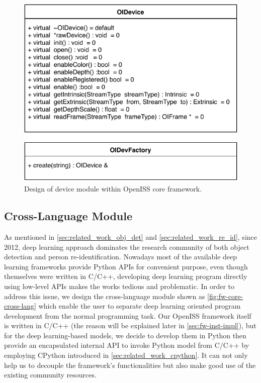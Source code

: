 \begin{figure}
    \centering
    \includegraphics[scale=0.8]{figures/framework_core_device.pdf}
    \caption{Design of device module within OpenISS core framework.}
    \label{fig:fw-core-device}
\end{figure}

\subsection{Cross-Language Module}
\label{sec:fw-design-core-cross-lang}

As mentioned in \autoref{sec:related_work_obj_det} and
\autoref{sec:related_work_re_id}, since 2012, deep learning approach dominates the
research community of both object detection and person re-identification.
Nowadays most of the available deep learning frameworks provide Python APIs for
convenient purpose, even though themselves were written in C/C++, developing
deep learning program directly using low-level APIs makes the works tedious and
problematic.
In order to address this issue, we design the cross-language module shown as
\autoref{fig:fw-core-cross-lang} which
enable the user to separate deep learning oriented program development from the
normal programming task. Our OpenISS framework itself is written in C/C++ (the
reason will be explained later in \autoref{sec:fw-inst-impl}), but for the deep
learning-based
models, we decide to develop them in Python then provide an encapsulated
internal API to invoke Python model from C/C++ by employing CPython introduced
in \autoref{sec:related_work_cpython}. It can not only help us to decouple the
framework's functionalities but also make good use of the existing community
resources.


